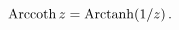 \[\mathop{\mathrm{Arccoth}\/}\nolimits z=\mathop{\mathrm{Arctanh}\/}\nolimits\!%
\left(1/z\right).\]
